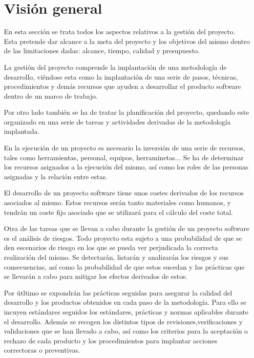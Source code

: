 \section {Visión general}
En esta sección se trata todos los aspectos relativos a la gestión del proyecto. Esta
pretende dar alcance a la meta del proyecto y los objetivos del mismo dentro de las
limitaciones dadas: alcance, tiempo, calidad y presupuesto. 

La gestión del proyecto comprende la implantación de una metodología de desarrollo, viéndose 
esta como la implantación de una serie de pasos, técnicas, procedimientos y demás recursos que
ayuden a desarrollar el producto software dentro de un marco de trabajo. 

Por otro lado también se ha de tratar la planificación del proyecto, quedando este organizado en una 
serie de tareas y actividades derivadas de la metodología implantada. 

En la ejecución de un proyecto es necesario la inversión de una serie de recursos, tales como herramientas, 
personal, equipos, herraminetas... Se ha de determinar los recursos asignados a la ejecución del mismo, así como los roles 
de las personas asignadas y la relación entre estas.

El desarrollo de un proyecto software tiene unos costes derivados de los recursos asociados al mismo. Estos recursos
serán tanto materiales como humanos, y tendrán un coste fijo asociado que se utilizará para el cálculo del coste total.

Otra de las tareas que se llevan a cabo durante la gestión de un proyecto software es el análisis de riesgos. Todo proyecto 
esta sujeto a una probabilidad de que se den escenarios de riesgo en los que se pueda ver perjudicada la correcta realización del mismo. 
Se detectarán, listarán y analizarán los riesgos y sus consecuencias, así como la probabilidad de que estos sucedan y las prácticas que se llevarán 
a cabo para mitigar los efectos derivados de estos.

Por útltimo se expondrán las prácticas seguidas para asegurar la calidad del desarrollo y los productos obtenidos en cada paso de la
metodología. Para ello se incuyen estándares seguidos los estándares, prácticas y normas aplicables durante el desarrollo. Además 
se recogen los distintos tipos de revisiones,verificaciones y validaciones que se han llevado a cabo, así como los criterios 
para la aceptación o rechazo de cada producto y los procedimientos para implantar acciones correctoras o preventivas.

